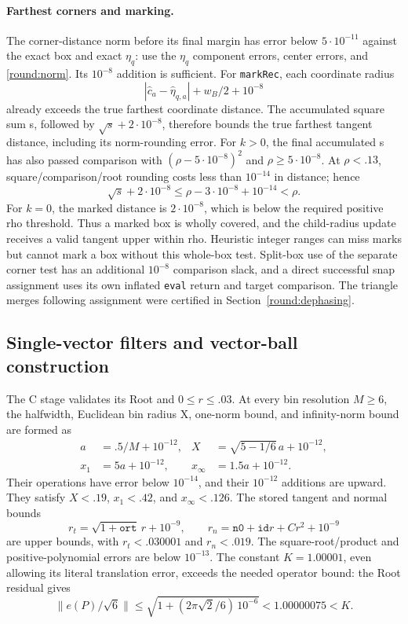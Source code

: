 \paragraph{Farthest corners and marking.}
The corner-distance norm before its final margin has error below
$5\cdot10^{-11}$ against the exact box and exact $\eta_q$:
use the $\eta_q$ component errors, center errors, and
\eqref{round:norm}.  Its $10^{-8}$ addition is sufficient.
For \texttt{markRec}, each coordinate radius
\[
 |\widehat c_a-\widehat\eta_{q,a}|+w_B/2+10^{-8}
\]
already exceeds the true farthest coordinate distance.
The accumulated square sum s, followed by
$\sqrt s+2\cdot10^{-8}$, therefore bounds the true farthest tangent
distance, including its norm-rounding error.
For $k>0$, the final accumulated s has also passed comparison with
$(\rho-5\cdot10^{-8})^2$ and $\rho\ge5\cdot10^{-8}$.
At $\rho<.13$, square/comparison/root rounding costs less than
$10^{-14}$ in distance; hence
\[
 \sqrt s+2\cdot10^{-8}
 \le \rho-3\cdot10^{-8}+10^{-14}<\rho.
\]
For $k=0$, the marked distance is $2\cdot10^{-8}$, which is below
the required positive rho threshold.
Thus a marked box is wholly covered, and the child-radius update
receives a valid tangent upper within rho.
Heuristic integer ranges can miss marks but cannot mark a box
without this whole-box test.
Split-box use of the separate corner test has an additional
$10^{-8}$ comparison slack, and a direct successful snap assignment
uses its own inflated \texttt{eval} return and target comparison.
The triangle merges following assignment were certified in
Section~\ref{round:dephasing}.

\subsection{Single-vector filters and vector-ball construction}
\label{round:single}

The C stage validates its Root and $0\le r\le.03$.
At every bin resolution $M\ge6$, the halfwidth, Euclidean bin
radius X, one-norm bound, and infinity-norm bound are formed as
\[
 \begin{aligned}
 a&=.5/M+10^{-12},&
 X&=\sqrt{5-1/6}\,a+10^{-12},\\
 x_1&=5a+10^{-12},&
 x_\infty&=1.5a+10^{-12}.
 \end{aligned}
\]
Their operations have error below $10^{-14}$, and their
$10^{-12}$ additions are upward.
They satisfy $X<.19$, $x_1<.42$, and $x_\infty<.126$.
The stored tangent and normal bounds
\[
 r_t=\sqrt{1+\mathtt{ort}}\,r+10^{-9},\qquad
 r_n=\mathtt{n0}+\mathtt{id}r+Cr^2+10^{-9}
\]
are upper bounds, with $r_t<.030001$ and $r_n<.019$.
The square-root/product and positive-polynomial errors are below
$10^{-13}$.
The constant $K=1.00001$, even allowing its literal translation
error, exceeds the needed operator bound: the Root residual gives
\[
 \|e(P)/\sqrt6\|
 \le\sqrt{1+(2\pi\sqrt2/6)\,10^{-6}}
 <1.00000075<K.
\]


